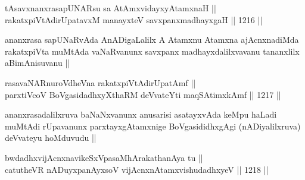 
\begin{shl}
tAsavxnanxrasapUNARsu sa AtAmx\s vidayxyA\s \s tamxnaH || \\
rakatxpiVtAdirUpatavxM manayxteV savxpanxmadhayxgaH ||  1216 ||  
\end{shl}

\begin{artha}
ananxrasa sapUNaRvAda AnADigaLalilx A Atamxnu Atamxna ajAcnxnadiMda rakatxpiVta muMtAda vaNaRvanunx savxpanx madhayxdalilxvavanu tananxlilx aBimAnisuvanu ||
\end{artha}

\begin{shl}
rasavaNARnuroVdheVna rakatxpiVtAdirUpatAmf || \\
parxtiVcoV BoVgasidadhxyXthaRM deVvateYti maqSAtimxkAmf ||  1217 ||  
\end{shl}

\begin{artha}
ananxrasadalilxruva baNaNxvanunx anusarisi asatayxvAda keMpu haLadi muMtAdi rUpavanunx parxtayxgAtamxnige BoVgasididhxgAgi (nADiyalilxruva) deVvateyu hoMduvudu ||
\end{artha}


\begin{shl}
bwdadhxvijAcnxnavikeSxVpasaMhArakathanAya tu || \\
catutheVR nADuyxpanAyxsoV vijAcnxnAtamxvishudadhxyeV ||  1218 ||  
\end{shl}

